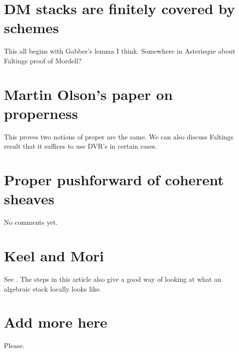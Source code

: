 \section{DM stacks are finitely covered by schemes}
\label{section-dm-finite-cover}

\noindent
This all begins with Gabber's lemma I think. Somewhere in Asterisque about
Faltings proof of Mordell?

\section{Martin Olson's paper on properness}
\label{section-proper-parametrization}

\noindent
This proves two notions of proper are the same. We can also discuss Faltings
result that it suffices to use DVR's in certain cases.

\section{Proper pushforward of coherent sheaves}
\label{section-proper-pushforward}

\noindent
No comments yet.

\section{Keel and Mori} 
\label{section-keel-mori}

\noindent
See \cite{K-M}. The steps in this article also give a good way of looking at
what an algebraic stack locally looks like.

\section{Add more here} 
\label{section-add-more}

\noindent
Please.









